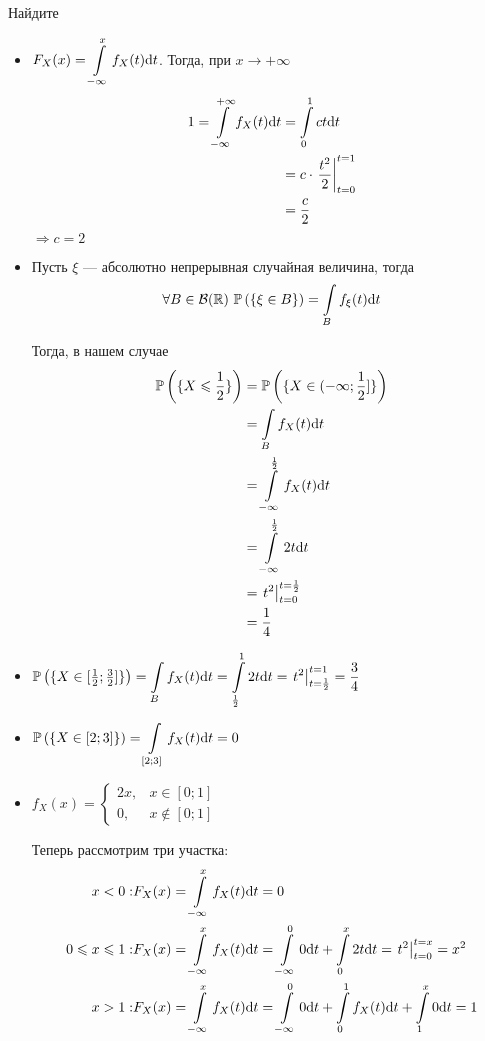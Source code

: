 \documentclass{article}
\begin{document}
Найдите
\begin{itemize}
    \item $F_X(x)=\displaystyle\int\limits_{-\infty}^{x} f_X(t)\text{d}t$. Тогда, при $x\to+\infty$
    \begin{equation*}
        \begin{aligned}
            1=\int\limits_{-\infty}^{+\infty} f_X(t)\text{d}t&=\int\limits_0^1 ct\text{d}t\\
            &=c\cdot\left.\frac{t^2}{2}\right\vert_{t=0}^{t=1}\\
            &=\frac{c}{2}
        \end{aligned}
    \end{equation*}
    $\Longrightarrow c=2$
    \item \theorem Пусть $\xi$ — абсолютно непрерывная случайная величина, тогда $$\forall B\in\mathcal{B}(\mathbb{R})\ \mathbb{P}\left(\{\xi\in B\}\right)=\displaystyle\int\limits_{B}f_{\xi}(t)\text{d}t$$
    
    Тогда, в нашем случае
    \begin{equation*}
        \begin{aligned}
            \mathbb{P}\left(\{X\leqslant\frac{1}{2}\}\right)&=\mathbb{P}\left(\{X\in(-\infty;\frac{1}{2}]\}\right)\\
            &=\int\limits_{B}f_{X}(t)\text{d}t\\
            &=\int\limits_{-\infty}^{\frac{1}{2}}f_{X}(t)\text{d}t\\
            &=\int\limits_{-\infty}^{\frac{1}{2}}2t\text{d}t\\
            &=\left.t^2\right\vert_{t=0}^{t=\frac{1}{2}}\\
            &=\frac{1}{4}
        \end{aligned}
    \end{equation*}
    \item $\mathbb{P}\left(\{X\in[\frac{1}{2};\frac{3}{2}]\}\right)=\displaystyle\int\limits_{B}f_{X}(t)\text{d}t=\int\limits_{\frac{1}{2}}^{1}2t\text{d}t=\left.t^2\right\vert_{t=\frac{1}{2}}^{t=1}=\frac{3}{4}$
    \item $\mathbb{P}\left(\{X\in[2;3]\}\right)=\displaystyle\int\limits_{[2;3]}f_{X}(t)\text{d}t=0$
    \item $f_{X}(x)=\begin{cases}
        2x,&x\in[0;1]\\
        0,&x\not\in[0;1]
    \end{cases}$

    Теперь рассмотрим три участка:
    \begin{equation*}
        \begin{aligned}
            x<0:& F_{X}(x)=\int\limits_{-\infty}^{x}f_{X}(t)\text{d}t=0\\
            0\leqslant x\leqslant 1:& F_{X}(x)=\int\limits_{-\infty}^{x}f_{X}(t)\text{d}t=\int\limits_{-\infty}^{0}0\text{d}t+\int\limits_{0}^x 2t\text{d}t=\left.t^2\right\vert_{t=0}^{t=x}=x^2\\
            x>1:& F_{X}(x)=\int\limits_{-\infty}^{x}f_{X}(t)\text{d}t=\int\limits_{-\infty}^0 0\text{d}t+\int\limits_{0}^1 f_{X}(t)\text{d}t+\int\limits_{1}^x0\text{d}t=1
        \end{aligned}
    \end{equation*}


\end{itemize}
\end{document}
